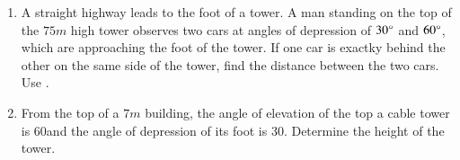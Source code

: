 \begin{enumerate}[label=\thesubsection.\arabic*.,ref=\thesubsection.\theenumi]
\begin{multicols}{4}
\begin{enumerate}
\item $45\degree$
\item $30\degree$
\item $90\degree$
	\end{enumerate}
\end{multicols}
 \hfill{}
%
\item
	A straight highway leads to the foot of a tower. A man standing on the top of the $75 {m}$ high tower observes two cars at angles of depression of $30\degree$ and $60\degree$, which are approaching the foot of the tower. If one car is exactky behind the other on the same side of the tower, find the distance between the two cars. Use .
\hfill{}\item
	From the top of a $7 {m}$ building, the angle of elevation of the top a cable tower is 60\degree and the angle of depression of its foot is 30\degree. Determine the height of the tower.
%
\hfill{}
%
\end{enumerate}
